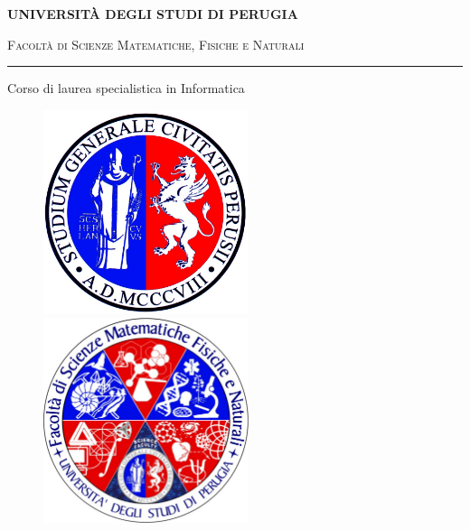 \begin{titlepage}
    \begin{center}
        \textbf{\Large UNIVERSIT\`{A} DEGLI STUDI DI PERUGIA}
        \vspace{0.5cm}

        {\scshape Facolt\`{a} di Scienze Matematiche, Fisiche e Naturali}

        \vspace{0.5cm}

        \rule[1mm]{\textwidth}{0.2mm}

        \vspace{1cm}

        \begin{Large}Corso di laurea specialistica in {Informatica}\end{Large}

        \vspace{0.5cm}

        \begin{figure}[htbp]
            \begin{center}
                \includegraphics[width=6cm]{immagini/logo_unipg.jpg}
                \includegraphics[width=6cm]{immagini/logo_scienze_unipg.jpg}
            \end{center}
        \end{figure}


\end{center}
\end{titlepage}

